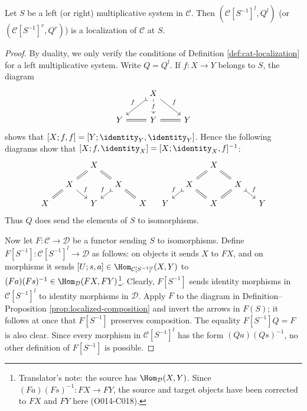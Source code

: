 \begin{theorem}\label{prop:Gabriel-Zisman}
	Let $S$ be a left (or right) multiplicative system in $\mathcal{C}$. Then
	$\left(\mathcal{C}[S^{-1}]^l,Q^l\right)$ (or
	$\left(\mathcal{C}[S^{-1}]^r,Q^r\right)$) is a localization of
	$\mathcal{C}$ at $S$.
\end{theorem}
\begin{proof}
	By duality, we only verify the conditions of Definition
	\ref{def:cat-localization} for a left multiplicative system. Write
	$Q=Q^l$. If $f:X\to Y$ belongs to $S$, the diagram
	\[ \begin{tikzcd}
		& X \arrow[rightarrowtail, ld, "f"'] \arrow[rd, "f"] \arrow[d, "f" description] & \\
		Y & Y \arrow[equal, l] \arrow[equal, r] & Y
	\end{tikzcd}\]
	shows that $[X;f,f]=[Y;\identity_Y,\identity_Y]$. Hence the following
	diagrams show that $[X;f,\identity_X]=[X;\identity_X,f]^{-1}$:
	\[\begin{tikzcd}[column sep=small, row sep=small]
		& & X \arrow[equal, ld] \arrow[equal, rd] & & \\
		& X \arrow[equal, ld] \arrow[rd, "f"] & & X \arrow[rightarrowtail, ld, "f"'] \arrow[equal, rd] & \\
		X & & Y & & X
	\end{tikzcd} \quad
	\begin{tikzcd}[column sep=small, row sep=small]
		& & X \arrow[equal, ld] \arrow[equal, rd] & & \\
		& X \arrow[rightarrowtail, ld, "f"'] \arrow[equal, rd] & & X \arrow[equal, ld] \arrow[rightarrowtail, rd, "f"] & \\
		Y & & X & & Y
	\end{tikzcd}\]
	Thus $Q$ does send the elements of $S$ to isomorphisms.

	Now let $F:\mathcal{C}\to\mathcal{D}$ be a functor sending $S$ to
	isomorphisms. Define
	$F[S^{-1}]:\mathcal{C}[S^{-1}]^l\to\mathcal{D}$ as follows: on objects it
	sends $X$ to $FX$, and on morphisms it sends
	$[U;s,a]\in\Hom_{\mathcal{C}[S^{-1}]^l}(X,Y)$ to
	$(Fa)(Fs)^{-1}\in\Hom_{\mathcal{D}}(FX,FY)$\footnote{Translator's note:
	the source has $\Hom_{\mathcal{D}}(X,Y)$. Since
	$(Fa)(Fs)^{-1}:FX\to FY$, the source and target objects have been corrected
	to $FX$ and $FY$ here (O014-C018).}. Clearly, $F[S^{-1}]$ sends identity
	morphisms in $\mathcal{C}[S^{-1}]^l$ to identity morphisms in $\mathcal{D}$.
	Apply $F$ to the diagram in Definition--Proposition
	\ref{prop:localized-composition} and invert the arrows in $F(S)$; it follows
	at once that $F[S^{-1}]$ preserves composition. The equality
	$F[S^{-1}]Q=F$ is also clear. Since every morphism in
	$\mathcal{C}[S^{-1}]^l$ has the form $(Qa)(Qs)^{-1}$, no other definition
	of $F[S^{-1}]$ is possible.
\end{proof}

